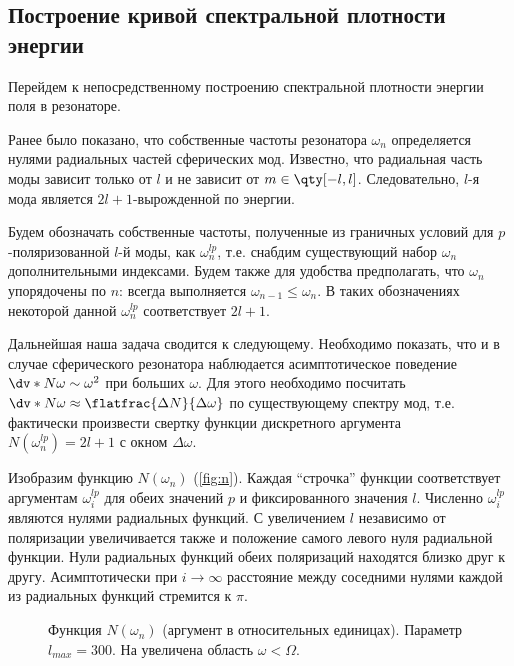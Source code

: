 %
%
%
%
%
%

\subsection{Построение кривой спектральной плотности энергии}

    Перейдем к непосредственному построению спектральной плотности энергии поля в резонаторе.

    Ранее было показано, что собственные частоты резонатора $\omega_n$ определяется нулями радиальных частей сферических мод. Известно, что радиальная часть моды зависит только от $l$ и не зависит от $m \in \qty[-l,l]$. Следовательно, $l$-я мода является $2l + 1$-вырожденной по энергии.

    Будем обозначать собственные частоты, полученные из граничных условий для $p$-поляризованной $l$-й моды, как $\omega^{lp}_n$, т.е. снабдим существующий набор $\omega_n$ дополнительными индексами. Будем также для удобства предполагать, что $\omega_n$ упорядочены по $n$: всегда выполняется $\omega_{n-1} \le \omega_n$. В таких обозначениях некоторой данной $\omega^{lp}_n$ соответствует $2l + 1$.

    Дальнейшая наша задача сводится к следующему. Необходимо показать, что и в случае сферического резонатора наблюдается асимптотическое поведение $\dv*{N}{\omega} \sim \omega^2$ при больших $\omega$. Для этого необходимо посчитать $\dv*{N}{\omega} \approx \flatfrac{\Delta N}{\Delta \omega}$ по существующему спектру мод, т.е. фактически произвести свертку функции дискретного аргумента $N(\omega^{lp}_n) = 2l + 1$ с окном $\Delta \omega$.

    Изобразим функцию $N(\omega_n)$ (\autoref{fig:n}). Каждая \enquote{строчка} функции соответствует аргументам $\omega^{lp}_i$ для обеих значений $p$ и фиксированного значения $l$. Численно $\omega^{lp}_i$ являются нулями радиальных функций. С увеличением $l$ независимо от поляризации увеличивается также и положение самого левого нуля радиальной функции. Нули радиальных функций обеих поляризаций находятся близко друг к другу. Асимптотически при $i \to \infty$ расстояние между соседними нулями каждой из радиальных функций стремится к $\pi$.
    \begin{figure}[h]
        \centering
        \subfloat[][]{%
            \label{fig:n_all}%
            \texttt{[image: n]}}%
        \hspace{8pt}%
        \hspace{8pt}%
        \caption[]{Функция $N(\omega_n)$ (аргумент в относительных единицах). Параметр $l_{max} = 300$. На  увеличена область $\omega < \Omega$. %
        } %
        \label{fig:n}%
    \end{figure}

